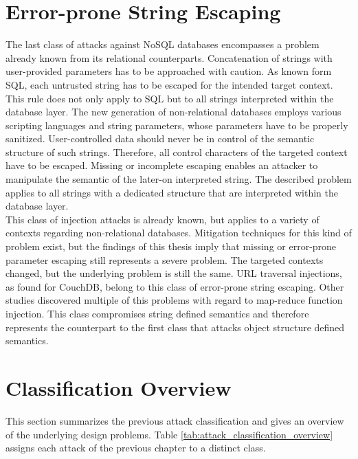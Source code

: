 \section{Error-prone String Escaping}
The last class of attacks against NoSQL databases encompasses a problem already known from its relational counterparts. Concatenation of strings with user-provided parameters has to be approached with caution. As known form SQL, each untrusted string has to be escaped for the intended target context. This rule does not only apply to SQL but to all strings interpreted within the database layer. The new generation of non-relational databases employs various scripting languages and string parameters, whose parameters have to be properly sanitized. User-controlled data should never be in control of the semantic structure of such strings. Therefore, all control characters of the targeted context have to be escaped. Missing or incomplete escaping enables an attacker to manipulate the semantic of the later-on interpreted string. The described problem applies to all strings with a dedicated structure that are interpreted within the database layer. \\

This class of injection attacks is already known, but applies to a variety of contexts regarding non-relational databases. Mitigation techniques for this kind of problem exist, but the findings of this thesis imply that missing or error-prone parameter escaping still represents a severe problem. The targeted contexts changed, but the underlying problem is still the same. URL traversal injections, as found for CouchDB, belong to this class of error-prone string escaping. Other studies discovered multiple of this problems with regard to map-reduce function injection. This class compromises string defined semantics and therefore represents the counterpart to the first class that attacks object structure defined semantics.\\

\section{Classification Overview}
This section summarizes the previous attack classification and gives an overview of the underlying design problems. Table \ref{tab:attack_classification_overview} assigns each attack of the previous chapter to a distinct class. \\

